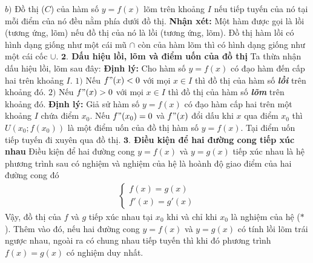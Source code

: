 \begin{multicols}{2}
	\vskip 0.1cm
	$b)$ Đồ thị ($C$) của hàm số $ y = f(x)$ lõm trên khoảng $I$ nếu tiếp tuyến của nó tại mỗi điểm của nó đều nằm phía dưới đồ thị.
	\vskip 0.1cm
	\textbf{\color{diendantoanhoc}Nhận xét:} Một hàm được gọi là lồi (tương ứng, lõm) nếu đồ thị của nó là lồi (tương ứng, lõm). Đồ thị hàm lồi có hình dạng giống như một cái mũ $\cap $ còn của hàm lõm thì có hình dạng giống như một cái cốc  $\cup $.
	\vskip 0.1cm
	\textbf{\color{diendantoanhoc}$\pmb{2.}$ Dấu hiệu lồi, lõm và điểm uốn của đồ thị}
	\vskip 0.1cm
	Ta thừa nhận dấu hiệu lồi, lõm sau đây:
	\vskip 0.1cm
	\textbf{\color{diendantoanhoc}Định lý:} Cho hàm số $y = f(x)$ có đạo hàm đến cấp hai trên khoảng $I$.
	\vskip 0.1cm
	$1)$ Nếu $f "(x)< 0$ với mọi $x\in I$ thì đồ thị của hàm số \textbf{\color{diendantoanhoc}\itshape lồi} trên khoảng đó. 
	\vskip 0.1cm
	$2)$ Nếu $f "(x)> 0$ với mọi $x\in I$ thì đồ thị của hàm số  \textbf{\color{diendantoanhoc}\itshape lõm} trên khoảng đó.
	\vskip 0.1cm
	\textbf{\color{diendantoanhoc}Định lý:} Giả sử hàm số $y = f(x)$ có đạo hàm cấp hai trên một khoảng $I$ chứa điểm $ x _0$. Nếu $f"(x_0) = 0$ và $f"(x) $ đổi dấu khi $x$ qua điểm $x_0$ thì $U(x_0;f(x_0))$ là một điểm uốn của đồ thị hàm số $y = f(x)$.
	\vskip 0.1cm
	Tại điểm uốn tiếp tuyến đi xuyên qua đồ thị.
	\vskip 0.1cm
	\textbf{\color{diendantoanhoc}$\pmb{3.}$ Điều kiện để hai đường cong tiếp xúc nhau}
	\vskip 0.1cm
	Điều kiện để hai đường cong $y= f(x)$ và $y=g(x) $ tiếp xúc nhau là hệ phương trình sau có nghiệm và nghiệm của hệ là hoành độ giao điểm của hai đường cong đó \begin{align*}
		\begin{cases}f(x)=g(x)\\ f'(x)=g'(x)\end{cases}\tag{$*$}
	\end{align*}
	Vậy, đồ thị của $f$ và $g$ tiếp xúc nhau tại $x_0$ khi và chỉ khi $x_0$ là nghiệm của hệ ($*$).
	\vskip 0.1cm
	Thêm vào đó, nếu hai đường cong $y=f(x)$ và $y=g(x)$ có tính lồi lõm trái ngược nhau, ngoài ra có chung nhau tiếp tuyến thì khi đó phương trình $f(x)=g(x)$ có nghiệm duy nhất.
	\begin{center}
\end{center}
\end{multicols}
